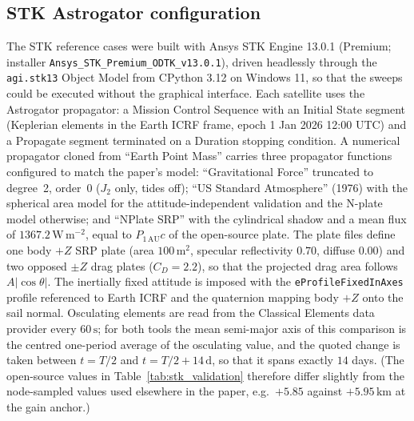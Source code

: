\subsection{STK Astrogator configuration}
\label{sec:val_stkconfig}
\noindent The STK reference cases were built with Ansys STK Engine 13.0.1 (Premium; installer \texttt{Ansys\_STK\_Premium\_\allowbreak ODTK\_v13.0.1}), driven headlessly through the \texttt{agi.stk13} Object Model from CPython 3.12 on Windows 11, so that the sweeps could be executed without the graphical interface. Each satellite uses the Astrogator propagator: a Mission Control Sequence with an Initial State segment (Keplerian elements in the Earth ICRF frame, epoch 1 Jan 2026 12:00 UTC) and a Propagate segment terminated on a Duration stopping condition. A numerical propagator cloned from ``Earth Point Mass'' carries three propagator functions configured to match the paper's model: ``Gravitational Force'' truncated to degree~2, order~0 (\(J_2\) only, tides off); ``US Standard Atmosphere'' (1976) with the spherical area model for the attitude-independent validation and the N-plate model otherwise; and ``NPlate SRP'' with the cylindrical shadow and a mean flux of \(1367.2\,\mathrm{W\,m^{-2}}\), equal to \(P_{1\,\mathrm{AU}}c\) of the open-source plate. The plate files define one body \(+Z\) SRP plate (area \(100\,\mathrm{m^2}\), specular reflectivity \(0.70\), diffuse \(0.00\)) and two opposed \(\pm Z\) drag plates (\(C_D = 2.2\)), so that the projected drag area follows \(A\lvert\cos\theta\rvert\). The inertially fixed attitude is imposed with the \texttt{eProfileFixedInAxes} profile referenced to Earth ICRF and the quaternion mapping body \(+Z\) onto the sail normal. Osculating elements are read from the Classical Elements data provider every \(60\,\mathrm{s}\); for both tools the mean semi-major axis of this comparison is the centred one-period average of the osculating value, and the quoted change is taken between \(t = T/2\) and \(t = T/2 + 14\,\mathrm{d}\), so that it spans exactly \(14\) days. (The open-source values in Table~\ref{tab:stk_validation} therefore differ slightly from the node-sampled values used elsewhere in the paper, e.g.\ \(+5.85\) against \(+5.95\,\mathrm{km}\) at the gain anchor.)

